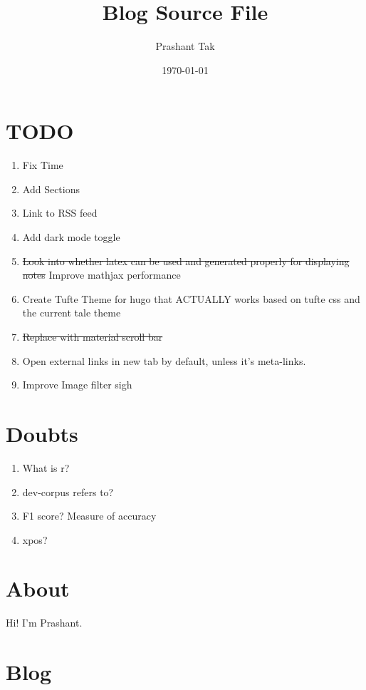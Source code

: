 \documentclass[11pt]{article}
\author{Prashant Tak}
\date{\today}
\title{Blog Source File}
\begin{document}
\maketitle
\tableofcontents \clearpage

\section{TODO}
\label{sec:org0cc4585}
\begin{enumerate}
\item Fix Time
\item Add Sections
\item Link to RSS feed
\item Add dark mode toggle
\item \sout{Look into whether latex can be used and generated properly for displaying notes} Improve mathjax performance
\item Create Tufte Theme for hugo that ACTUALLY works based on tufte css and the current tale theme
\item \sout{Replace with material scroll bar}
\item Open external links in new tab by default, unless it's meta-links.
\item Improve Image filter sigh
\end{enumerate}
\section{Doubts}
\label{sec:org56d9ae2}
\begin{enumerate}
\item What is r?
\item dev-corpus refers to?
\item F1 score? Measure of accuracy
\item xpos?
\end{enumerate}

\section{About}
\label{sec:org872d5c7}
Hi! I'm Prashant.

\section{Blog}
\label{sec:org9940d7a}
\end{document}
